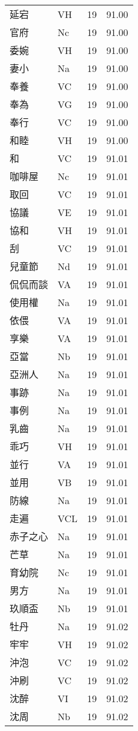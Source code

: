 \documentclass[twocolumn]{book}
\begin{document}
\begin{supertabular}{llrr}
延宕 & VH & 19 &  91.00\\
官府 & Nc & 19 &  91.00\\
委婉 & VH & 19 &  91.00\\
妻小 & Na & 19 &  91.00\\
奉養 & VC & 19 &  91.00\\
奉為 & VG & 19 &  91.00\\
奉行 & VC & 19 &  91.00\\
和睦 & VH & 19 &  91.00\\
和 & VC & 19 &  91.01\\
咖啡屋 & Nc & 19 &  91.01\\
取回 & VC & 19 &  91.01\\
協議 & VE & 19 &  91.01\\
協和 & VH & 19 &  91.01\\
刮 & VC & 19 &  91.01\\
兒童節 & Nd & 19 &  91.01\\
侃侃而談 & VA & 19 &  91.01\\
使用權 & Na & 19 &  91.01\\
依偎 & VA & 19 &  91.01\\
享樂 & VA & 19 &  91.01\\
亞當 & Nb & 19 &  91.01\\
亞洲人 & Na & 19 &  91.01\\
事跡 & Na & 19 &  91.01\\
事例 & Na & 19 &  91.01\\
乳齒 & Na & 19 &  91.01\\
乖巧 & VH & 19 &  91.01\\
並行 & VA & 19 &  91.01\\
並用 & VB & 19 &  91.01\\
防線 & Na & 19 &  91.01\\
走遍 & VCL & 19 &  91.01\\
赤子之心 & Na & 19 &  91.01\\
芒草 & Na & 19 &  91.01\\
育幼院 & Nc & 19 &  91.01\\
男方 & Na & 19 &  91.01\\
玖順盃 & Nb & 19 &  91.01\\
牡丹 & Na & 19 &  91.02\\
牢牢 & VH & 19 &  91.02\\
沖泡 & VC & 19 &  91.02\\
沖刷 & VC & 19 &  91.02\\
沈醉 & VI & 19 &  91.02\\
沈周 & Nb & 19 &  91.02\\

\end{supertabular}
\end{document}
